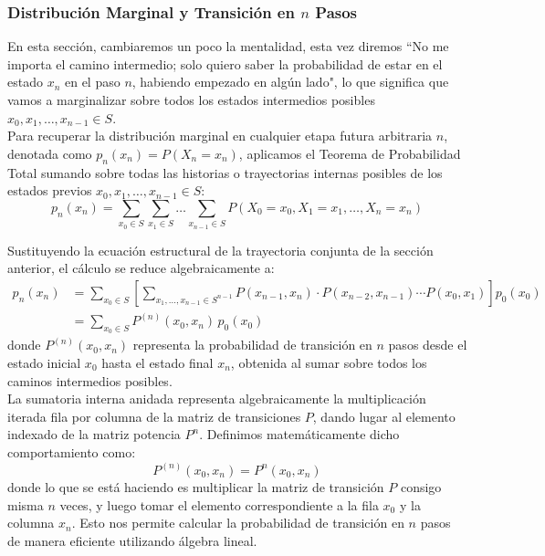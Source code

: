 \documentclass[10pt]{book}
\begin{document}
\subsubsection{Distribución Marginal y Transición en $n$ Pasos}
\noindent
En esta sección, cambiaremos un poco la mentalidad, esta vez diremos ``No me importa el camino intermedio; solo quiero saber la probabilidad de estar en el estado $x_n$ en el paso $n$, habiendo empezado en algún lado", lo que significa que vamos a marginalizar sobre todos los estados intermedios posibles $x_0, x_1, \dots, x_{n-1} \in S$. \\

\noindent
Para recuperar la distribución marginal en cualquier etapa futura arbitraria $n$, denotada como $p_n(x_n) = P(X_n = x_n)$, aplicamos el Teorema de Probabilidad Total sumando sobre todas las historias o trayectorias internas posibles de los estados previos $x_0, x_1, \dots, x_{n-1} \in S$:
\begin{equation*}
    p_n(x_n) = \sum_{x_0 \in S} \sum_{x_1 \in S} \dots \sum_{x_{n-1} \in S} P(X_0 = x_0, X_1 = x_1, \dots, X_n = x_n)
\end{equation*}

\noindent Sustituyendo la ecuación estructural de la trayectoria conjunta de la sección anterior, el cálculo se reduce algebraicamente a:
\begin{align*}
    p_n(x_n) &= \sum_{x_0 \in S} \left[ \sum_{x_1, \dots, x_{n-1} \in S^{n-1}} P(x_{n-1}, x_n) \cdot P(x_{n-2}, x_{n-1}) \cdots P(x_0, x_1) \right] p_0(x_0) \nonumber \\
    &= \sum_{x_0 \in S} P^{(n)}(x_0, x_n) \, p_0(x_0)
\end{align*}
donde $P^{(n)}(x_0, x_n)$ representa la probabilidad de transición en $n$ pasos desde el estado inicial $x_0$ hasta el estado final $x_n$, obtenida al sumar sobre todos los caminos intermedios posibles. \\

\noindent
La sumatoria interna anidada representa algebraicamente la multiplicación iterada fila por columna de la matriz de transiciones $P$, dando lugar al elemento indexado de la matriz potencia $P^n$. Definimos matemáticamente dicho comportamiento como:
\begin{equation*}
    P^{(n)}(x_0, x_n) = P^n(x_0, x_n)
\end{equation*}
donde lo que se está haciendo es multiplicar la matriz de transición $P$ consigo misma $n$ veces, y luego tomar el elemento correspondiente a la fila $x_0$ y la columna $x_n$. Esto nos permite calcular la probabilidad de transición en $n$ pasos de manera eficiente utilizando álgebra lineal.
\end{document}
